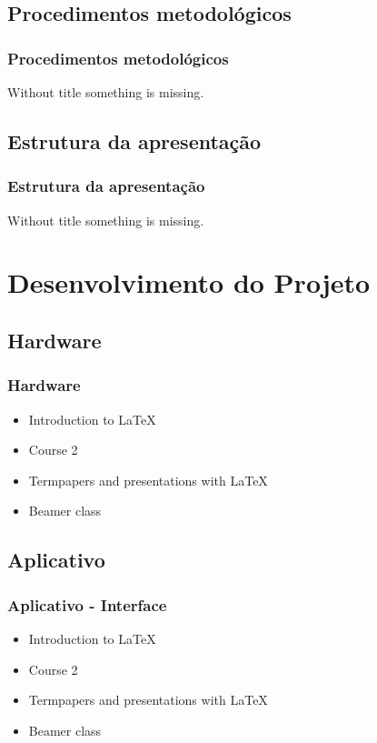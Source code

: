 \documentclass[hyperref={pdfpagelabels=false}]{beamer}
\begin{document}
            \subsection{Procedimentos metodológicos}

                \begin{frame}\frametitle{Procedimentos metodológicos}
                    Without title something is missing.
                \end{frame}

            \subsection{Estrutura da apresentação}

                \begin{frame}\frametitle{Estrutura da apresentação}
                    Without title something is missing.
                \end{frame}

        \section{Desenvolvimento do Projeto}

            \subsection{Hardware}

                \begin{frame}\frametitle{Hardware}
                    \begin{itemize}
                        \item Introduction to  \LaTeX
                        \item Course 2
                        \item Termpapers and presentations with \LaTeX
                        \item Beamer class
                    \end{itemize}
                \end{frame}

            \subsection{Aplicativo}

                \begin{frame}\frametitle{Aplicativo - Interface}
                    \begin{itemize}
                        \item Introduction to  \LaTeX \pause
                        \item Course 2 \pause
                        \item Termpapers and presentations with \LaTeX \pause
                        \item Beamer class
                    \end{itemize}
                \end{frame}
\end{document}
